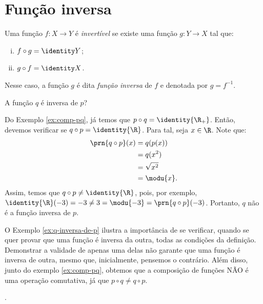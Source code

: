 \section{Função inversa}

\begin{definition}
\label{def:funcao-inversa}
Uma função $f: X \to Y$ é \emph{invertível} se existe uma função $g: Y \to X$ tal que:
%
\begin{enumerate}[(i)]
  \item $f \circ g = \identity Y$;
  \item $g \circ f = \identity X$.
\end{enumerate}
%
Nesse caso, a função $g$ é dita \emph{função inversa} de $f$ e denotada por $g = f^{-1}$.
\end{definition}

\begin{example}
\label{ex:q-inversa-de-p}
	A função $q$ é inversa de $p$?
\end{example}

\begin{solution}
Do Exemplo \ref{ex:comp-pq}, já temos que $p \circ q = \identity{\R_+}$.
Então, devemos verificar se $q \circ p = \identity{\R}$.
Para tal, seja $x \in \R$. 
Note que:
%
\begin{align*}
	\prn{q \circ p}(x) &= q(p(x)) \\ &= q(x^2) \\ &= \sqrt{x^2} \\ &= \modu{x}.
\end{align*}
%
Assim, temos que $q \circ p \ne \identity{\R}$, pois, por exemplo, $\identity{\R}(-3) = -3 \ne 3 = \modu{-3} = \prn{q \circ p}(-3)$.
Portanto, $q$ não é a função inversa de $p$.
\end{solution}

O Exemplo \ref{ex:q-inversa-de-p} ilustra a importância de se verificar, quando se quer provar que uma função é inversa da outra, todas as condições da definição.
Demonstrar a validade de apenas uma delas não garante que uma função é inversa de outra, mesmo que, inicialmente, pensemos o contrário.
Além disso, junto do exemplo \ref{ex:comp-pq}, obtemos que a composição de funções NÃO é uma operação comutativa, já que $p \circ q  \ne q \circ p$.

\begin{onlineact}
	.
\end{onlineact}